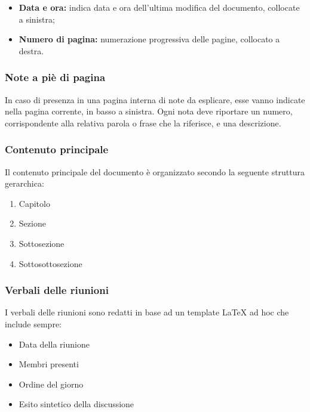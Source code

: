 \documentclass[../NormediProgetto.tex]{subfiles}
\begin{document}
\begin{itemize}
    \item \textbf{Data e ora:} indica data e ora dell'ultima modifica del documento, collocate a sinistra;
    \item \textbf{Numero di pagina:} numerazione progressiva delle pagine, collocato a destra.
\end{itemize}

\subsubsection{Note a piè di pagina}

In caso di presenza in una pagina interna di note da esplicare, esse vanno indicate nella pagina corrente, in basso a sinistra. Ogni nota deve riportare un numero, corrispondente alla relativa parola o frase che la riferisce, e una descrizione.

\subsubsection{Contenuto principale}

Il contenuto principale del documento è organizzato secondo la seguente struttura gerarchica:

\begin{enumerate}
    \item Capitolo
    \item Sezione
    \item Sottosezione
    \item Sottosottosezione
\end{enumerate}

\subsubsection{Verbali delle riunioni}

I verbali delle riunioni sono redatti in base ad un template \LaTeX{} ad hoc che include sempre:

\begin{itemize}
    \item Data della riunione
    
    \item Membri presenti
    
    \item Ordine del giorno
    
    \item Esito sintetico della discussione
\end{itemize}
\end{document}

